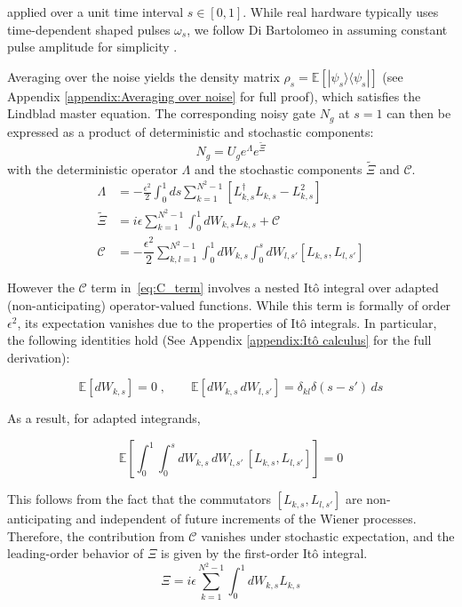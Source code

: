 \documentclass[9pt,a4paper,twocolumn,twoside]{tau-class/tau}
\begin{document}
applied over a unit time interval $s \in [0,1]$. While real hardware typically uses time-dependent shaped pulses $\omega_s$, we follow Di Bartolomeo in assuming constant pulse amplitude for simplicity \cite{dibartolomeo2023noisy}.

Averaging over the noise yields the density matrix $\rho_s = \mathbb{E}[|\psi_s\rangle\langle\psi_s|]$ (see Appendix \ref{appendix:Averaging over noise} for full proof), which satisfies the Lindblad master equation. The corresponding noisy gate $N_g$ at $s = 1$ can then be expressed as a product of deterministic and stochastic components:
\begin{equation}
N_g = U_g e^{\Lambda} e^{\tilde\Xi}
\label{eq: noisy gate N}
\end{equation}
with the deterministic operator $\Lambda$ and the stochastic components $\tilde{\Xi}$ and $\mathcal{C}$.
\begin{align}
\Lambda &= -\frac{\epsilon^2}{2} \int_0^1 ds \sum_{k=1}^{N^2-1}[L_{k,s}^\dagger L_{k,s} -L_{k,s}^2] \label{eq:lambda}\\
\tilde\Xi &= i\epsilon\sum_{k=1}^{N^2-1} \int_0^1 dW_{k,s}L_{k,s} + \mathcal{C} \label{eq:xi}\\
\mathcal{C} &= - \dfrac{\epsilon^2}{2} \sum_{k,l = 1}^{N^2-1}\int_0^1 dW_{k, s} \int_0^s dW_{l, s'} [L_{k,s}, L_{l,s'}] \label{eq:C_term}
\end{align}

However the \(\mathcal{C}\) term in~\eqref{eq:C_term} involves a nested Itô integral over adapted (non-anticipating) operator-valued functions. While this term is formally of order \(\epsilon^2\), its expectation vanishes due to the properties of Itô integrals. In particular, the following identities hold (See Appendix \ref{appendix:Itô calculus} for the full derivation):

\begin{equation}
    \mathbb{E}[dW_{k,s}] = 0\;, \quad \quad
    \mathbb{E}[dW_{k,s} \, dW_{l,s'}] = \delta_{kl} \delta(s - s')\, ds \label{eq:ito_isometry}
\end{equation}

As a result, for adapted integrands,

\begin{equation}
    \mathbb{E} \left[ \int_0^1 \int_0^s dW_{k,s} \, dW_{l,s'} \, [L_{k,s}, L_{l,s'}] \right] = 0
    \label{eq: expectation over ito integrals}
\end{equation}

This follows from the fact that the commutators \([L_{k,s}, L_{l,s'}]\) are non-anticipating and independent of future increments of the Wiener processes. Therefore, the contribution from \(\mathcal{C}\) vanishes under stochastic expectation, and the leading-order behavior of \(\Xi\) is given by the first-order Itô integral.
\begin{equation}
 \Xi = i\epsilon\sum_{k=1}^{N^2-1} \int_0^1 dW_{k,s}L_{k,s}
\label{eq: stochastic operator xi~}
\end{equation}
\end{document}
